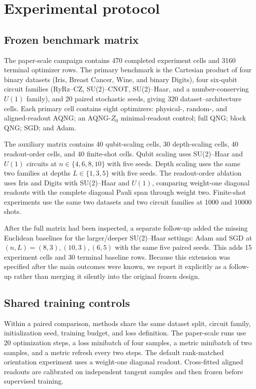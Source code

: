 \section{Experimental protocol}

\subsection{Frozen benchmark matrix}
The paper-scale campaign contains 470 completed experiment cells and 3160 terminal optimizer rows. The primary benchmark is the Cartesian product of four binary datasets (Iris, Breast Cancer, Wine, and binary Digits), four six-qubit circuit families (RyRz--CZ, SU(2)--CNOT, SU(2)--Haar, and a number-conserving $U(1)$ family), and 20 paired stochastic seeds, giving 320 dataset--architecture cells. Each primary cell contains eight optimizers: physical-, random-, and aligned-readout AQNG; an AQNG-$Z_0$ minimal-readout control; full QNG; block QNG; SGD; and Adam.

The auxiliary matrix contains 40 qubit-scaling cells, 30 depth-scaling cells, 40 readout-order cells, and 40 finite-shot cells. Qubit scaling uses SU(2)--Haar and $U(1)$ circuits at $n\in\{4,6,8,10\}$ with five seeds. Depth scaling uses the same two families at depths $L\in\{1,3,5\}$ with five seeds. The readout-order ablation uses Iris and Digits with SU(2)--Haar and $U(1)$, comparing weight-one diagonal readouts with the complete diagonal Pauli span through weight two. Finite-shot experiments use the same two datasets and two circuit families at 1000 and 10000 shots.

After the full matrix had been inspected, a separate follow-up added the missing Euclidean baselines for the larger/deeper SU(2)--Haar settings: Adam and SGD at $(n,L)=(8,3),(10,3),(6,5)$ with the same five paired seeds. This adds 15 experiment cells and 30 terminal baseline rows. Because this extension was specified after the main outcomes were known, we report it explicitly as a follow-up rather than merging it silently into the original frozen design.

\subsection{Shared training controls}
Within a paired comparison, methods share the same dataset split, circuit family, initialization seed, training budget, and loss definition. The paper-scale runs use 20 optimization steps, a loss minibatch of four samples, a metric minibatch of two samples, and a metric refresh every two steps. The default rank-matched orientation experiment uses a weight-one diagonal readout. Cross-fitted aligned readouts are calibrated on independent tangent samples and then frozen before supervised training.

